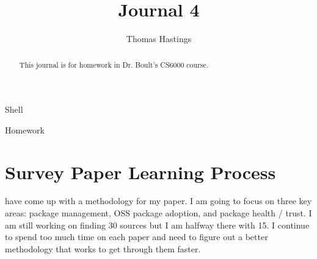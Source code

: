 \documentclass[journal]{IEEEtran}
\begin{document}
  \title{Journal 4}
  \author{Thomas Hastings}%
  
  {Shell}
  \maketitle
  
  \begin{abstract}
  This journal is for homework in Dr. Boult's CS6000 course.
  \end{abstract}
  
  \begin{IEEEkeywords}
  Homework
  \end{IEEEkeywords}
  
  
  \section{Survey Paper Learning Process}
   have come up with a methodology for my paper. I am going to focus on three key areas: package management, OSS package adoption, and package health / trust. I am still working on finding 30 sources but I am halfway there with 15. I continue to spend too much time on each paper and need to figure out a better methodology that works to get through them faster.
  
  
\end{document}
